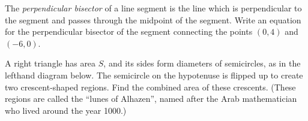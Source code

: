 The \textit{perpendicular bisector} of a line segment is the line which is perpendicular to the segment and passes through the midpoint of the segment. Write an equation for the perpendicular bisector of the segment connecting the points $(0,4)$ and $(-6,0)$.
%
%
%
%


A right triangle has area $S$, and its sides form diameters of semicircles, as in the lefthand diagram below. The semicircle on the hypotenuse is flipped up to create two crescent-shaped regions. Find the combined area of these crescents. (These regions are called the ``lunes of Alhazen'', named after the Arab mathematician who lived around the year 1000.)

